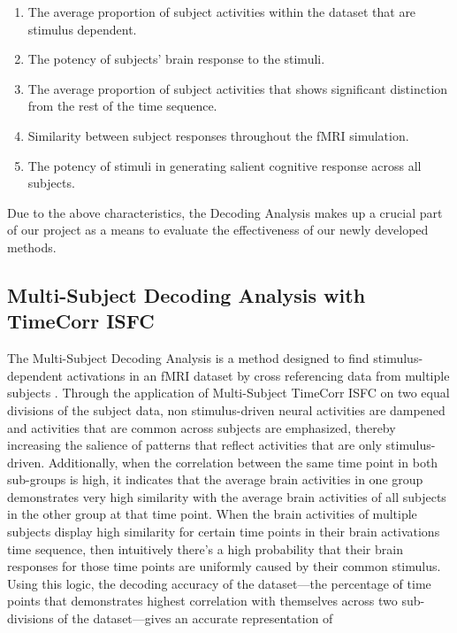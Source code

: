 \documentclass[11pt]{article}
\begin{document}
\begin{enumerate}
\begin{enumerate}
\item The average proportion of subject activities within the dataset that are stimulus dependent.
\item The potency of subjects' brain response to the stimuli.
\item The average proportion of subject activities that shows significant distinction from the rest of the time sequence.
\item Similarity between subject responses throughout the fMRI simulation.
\item The potency of stimuli in generating salient cognitive response across all subjects.
\end{enumerate}

Due to the above characteristics, the Decoding Analysis makes up a crucial part of our project as a means to evaluate the effectiveness of our newly developed methods.




\subsection{Multi-Subject Decoding Analysis with TimeCorr ISFC}
The Multi-Subject Decoding Analysis is a method designed to find stimulus-dependent activations in an fMRI dataset by cross referencing data from multiple subjects \citep{jeremy2017}. Through the application of Multi-Subject TimeCorr ISFC on two equal divisions of the subject data, non stimulus-driven neural activities are dampened and activities that are common across subjects are emphasized, thereby increasing the salience of patterns that reflect activities that are only stimulus-driven. Additionally, when the correlation between the same time point in both sub-groups is high, it indicates that the average brain activities in one group demonstrates very high similarity with the average brain activities of all subjects in the other group at that time point. When the brain activities of multiple subjects display high similarity for certain time points in their brain activations time sequence, then intuitively there's a high probability that their brain responses for those time points are uniformly caused by their common stimulus. Using this logic, the decoding accuracy of the dataset---the percentage of time points that demonstrates highest correlation with themselves across two sub-divisions of the dataset---gives an accurate representation of


\end{enumerate}
\end{document}
